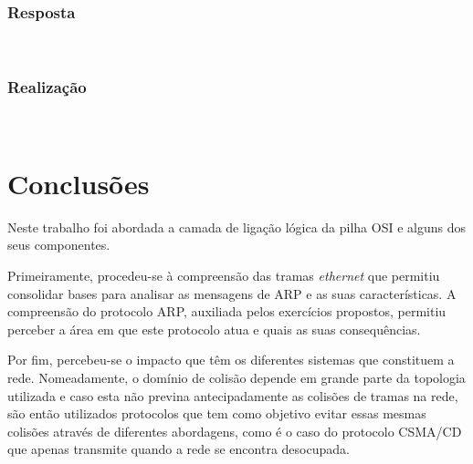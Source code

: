 \documentclass{llncs}
\begin{document}
\subsubsection{Resposta}\rule[-10pt]{0pt}{10pt}\\



\subsubsection{Realização}\rule[-10pt]{0pt}{10pt}\\



\clearpage

\section{Conclusões}

\hspace{5mm} Neste trabalho foi abordada a camada de ligação lógica da pilha OSI e alguns dos seus componentes. 

Primeiramente, procedeu-se à compreensão das tramas \textit{ethernet} que permitiu consolidar bases para analisar as mensagens de ARP e as suas características. A compreensão do protocolo ARP, auxiliada pelos exercícios propostos, permitiu perceber a área em que este protocolo atua e quais as suas consequências.

Por fim, percebeu-se o impacto que têm os diferentes sistemas que constituem a rede. Nomeadamente, o domínio de colisão depende em grande parte da topologia utilizada e caso esta não previna antecipadamente as colisões de tramas na rede, são então utilizados protocolos que tem como objetivo evitar essas mesmas colisões através de diferentes abordagens, como é o caso do protocolo CSMA/CD que apenas transmite quando a rede se encontra desocupada.



\end{document}
